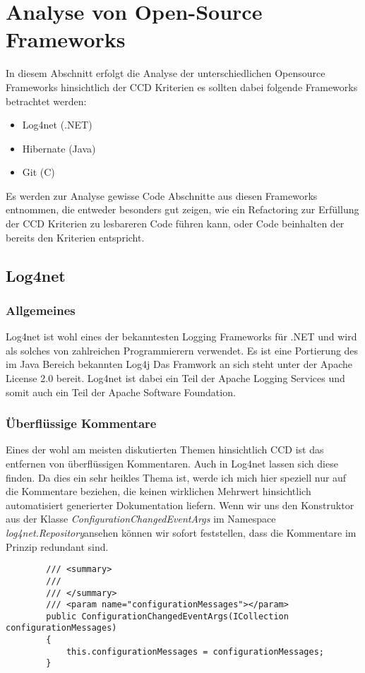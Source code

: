 \chapter{Analyse von Open-Source Frameworks}
\label{chap:Abbildungen}
In diesem Abschnitt erfolgt die Analyse der unterschiedlichen Opensource Frameworks hinsichtlich der CCD Kriterien es sollten dabei folgende Frameworks betrachtet werden:

\begin{itemize}
	\item Log4net (.NET)
	\item Hibernate (Java)
	\item Git (C)
\end{itemize}

Es werden zur Analyse gewisse Code Abschnitte aus diesen Frameworks entnommen, die entweder besonders gut zeigen, wie ein Refactoring zur Erfüllung der CCD Kriterien zu lesbareren Code führen kann, oder Code beinhalten der bereits den Kriterien entspricht. 
\section{Log4net}
\subsection{Allgemeines}
Log4net ist wohl eines der bekanntesten Logging Frameworks für .NET und wird als solches von zahlreichen Programmierern verwendet. Es ist eine Portierung des im Java Bereich bekannten Log4j Das Framwork an sich steht unter der Apache License 2.0 bereit. Log4net ist dabei ein Teil der Apache Logging Services und somit auch ein Teil der Apache Software Foundation. 

\subsection{Überflüssige Kommentare}
Eines der wohl am meisten diskutierten Themen hinsichtlich CCD ist das entfernen von überflüssigen Kommentaren. Auch in Log4net lassen sich diese finden. Da dies ein sehr heikles Thema ist, werde ich mich hier speziell nur auf die Kommentare beziehen, die keinen wirklichen Mehrwert hinsichtlich automatisiert generierter Dokumentation liefern. Wenn wir uns den Konstruktor aus der Klasse \textit{ConfigurationChangedEventArgs} im Namespace \textit{log4net.Repository}ansehen können wir sofort feststellen, dass die Kommentare im Prinzip redundant sind.

\lstset{style=sharpc}
\begin{lstlisting}
        /// <summary>
        /// 
        /// </summary>
        /// <param name="configurationMessages"></param>
        public ConfigurationChangedEventArgs(ICollection configurationMessages)
        {
            this.configurationMessages = configurationMessages;
        }
\end{lstlisting}

